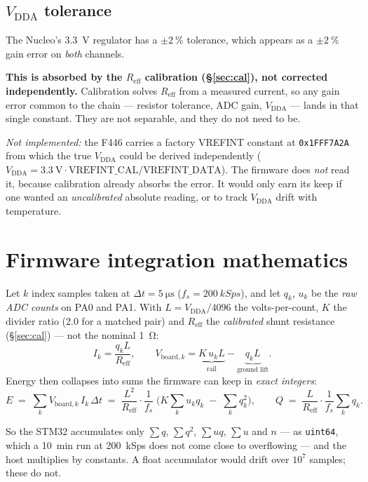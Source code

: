 \documentclass[11pt,a4paper]{article}
\begin{document}
\subsection{$V_\text{DDA}$ tolerance}

The Nucleo's \SI{3.3}{\volt} regulator has a $\pm\SI{2}{\percent}$ tolerance, which appears as a
$\pm\SI{2}{\percent}$ gain error on \emph{both} channels.

\medskip
\noindent
\textbf{This is absorbed by the $R_\text{eff}$ calibration (\S\ref{sec:cal}), not corrected
independently.} Calibration solves $R_\text{eff}$ from a measured current, so any gain error
common to the chain --- resistor tolerance, ADC gain, $V_\text{DDA}$ --- lands in that single
constant. They are not separable, and they do not need to be.

\medskip
\noindent
\textit{Not implemented:} the F446 carries a factory VREFINT constant at \texttt{0x1FFF7A2A} from
which the true $V_\text{DDA}$ could be derived independently
($V_\text{DDA} = \SI{3.3}{\volt}\cdot\text{VREFINT\_CAL}/\text{VREFINT\_DATA}$). The firmware does
\emph{not} read it, because calibration already absorbs the error. It would only earn its keep if
one wanted an \emph{uncalibrated} absolute reading, or to track $V_\text{DDA}$ drift with
temperature.

\section{Firmware integration mathematics}
\label{sec:math}

Let $k$ index samples taken at $\Delta t = \SI{5}{\micro\second}$ ($f_s = \SI{200}{kSps}$), and
let $q_k$, $u_k$ be the \emph{raw ADC counts} on PA0 and PA1. With $L = V_\text{DDA}/4096$ the
volts-per-count, $K$ the divider ratio (\num{2.0} for a matched pair) and $R_\text{eff}$ the
\emph{calibrated} shunt resistance (\S\ref{sec:cal}) --- not the nominal \SI{1}{\ohm}:
\[
I_k = \frac{q_k L}{R_\text{eff}},
\qquad
V_{\text{board},k} = \underbrace{K\,u_k L}_{\text{rail}} - \underbrace{q_k L}_{\text{ground lift}} .
\]
Energy then collapses into sums the firmware can keep in \emph{exact integers}:
\[
E \;=\; \sum_k V_{\text{board},k}\, I_k \,\Delta t
  \;=\; \frac{L^2}{R_\text{eff}}\cdot\frac{1}{f_s}\;
        \Big(K \textstyle\sum_k u_k q_k \;-\; \sum_k q_k^2\Big),
\qquad
Q \;=\; \frac{L}{R_\text{eff}}\cdot\frac{1}{f_s}\sum_k q_k .
\]

\noindent
So the STM32 accumulates only $\sum q$, $\sum q^2$, $\sum u q$, $\sum u$ and $n$ --- as
\texttt{uint64}, which a \SI{10}{\minute} run at \SI{200}{kSps} does not come close to overflowing
--- and the host multiplies by constants. A float accumulator would drift over $10^7$ samples;
these do not.
\end{document}
